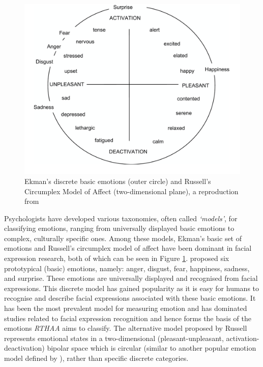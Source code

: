 \documentclass[12pt, a4paper]{article}
\begin{document}
\begin{figure}[H]
    \centering
    \includegraphics[scale=0.50]{images/ekmanrussel.png}
    \caption{Ekman's discrete basic emotions (outer circle) and Russell's Circumplex Model of Affect (two-dimensional plane), a reproduction from \cite{feldman1998independence}}
    \label{fig:ekmanrussel}
\end{figure}

Psychologists have developed various taxonomies, often called \textit{`models'}, for classifying emotions, ranging from universally displayed basic emotions to complex, culturally specific ones. Among these models, Ekman's basic set of emotions \citep{ekman} and Russell's circumplex model of affect \citep{russell1980circumplex} have been dominant in facial expression research, both of which can be seen in Figure \ref{fig:ekmanrussel}. \cite*{ekman1971constants} proposed six prototypical (basic) emotions, namely: anger, disgust, fear, happiness, sadness, and surprise. These emotions are universally displayed and recognised from facial expressions. This discrete model has gained popularity as it is easy for humans to recognise and describe facial expressions associated with these basic emotions. It has been the most prevalent model for measuring emotion and has dominated studies related to facial expression recognition and hence forms the basis of the emotions \textit{RTHAA} aims to classify. The alternative model proposed by Russell represents emotional states in a two-dimensional (pleasant-unpleasant, activation-deactivation) bipolar space  which is circular (similar to another popular emotion model defined by \cite{plutchik2001nature}), rather than specific discrete categories. 
\end{document}
